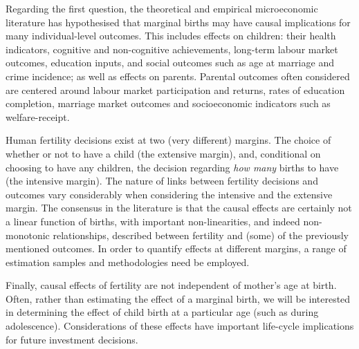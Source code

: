 \documentclass{article}
\begin{document}
\begin{spacing}{1.4}
Regarding the first question, the theoretical and empirical microeconomic 
literature has hypothesised that marginal births may have causal implications 
for many individual-level outcomes.  This includes effects on children: their 
health indicators, cognitive and non-cognitive achievements, long-term labour 
market outcomes, education inputs, and social outcomes such as age at marriage 
and crime incidence; as well as effects on parents. Parental outcomes often 
considered are centered around labour market participation and returns, rates 
of education completion, marriage market outcomes and socioeconomic indicators 
such as welfare-receipt.  %

Human fertility decisions exist at two (very different) margins.  The choice of
whether or not to have a child (the extensive margin), and, conditional on 
choosing to have any children, the decision regarding \emph{how many} births
to have (the intensive margin).  The nature of links between fertility decisions
and outcomes vary considerably when considering the intensive and the extensive
margin.  The consensus in the literature is that the causal effects are 
certainly not a linear function of births, with important non-linearities, and 
indeed non-monotonic relationships, described between fertility and (some) of 
the previously mentioned outcomes. In order to quantify effects at different 
margins, a range of estimation samples and methodologies need be employed.  

Finally, causal effects of fertility are not independent of mother's age at 
birth.  Often, rather than estimating the effect of a marginal birth, we will be
interested in determining the effect of child birth at a particular age (such as
during adolescence).  Considerations of these effects have important life-cycle
implications for future investment decisions.


\end{spacing}
\end{document}
